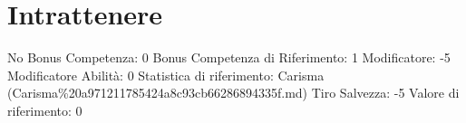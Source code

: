\section{Intrattenere}\label{intrattenere}

\begin{description}
\tightlist
\item[Tags: ABI]
No Bonus Competenza: 0 Bonus Competenza di Riferimento: 1 Modificatore:
-5 Modificatore Abilità: 0 Statistica di riferimento: Carisma
(Carisma\%20a971211785424a8c93cb66286894335f.md) Tiro Salvezza: -5
Valore di riferimento: 0
\end{description}

